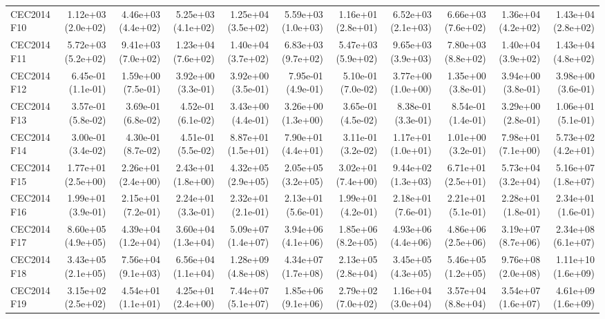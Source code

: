 \begin{longtable}{lrrrrrrrrrr}
CEC2014 F10 & 1.12e+03 (2.0e+02) & 4.46e+03 (4.4e+02) & 5.25e+03 (4.1e+02) & 1.25e+04 (3.5e+02) & 5.59e+03 (1.0e+03) & 1.16e+01 (2.8e+01) & 6.52e+03 (2.1e+03) & 6.66e+03 (7.6e+02) & 1.36e+04 (4.2e+02) & 1.43e+04 (2.8e+02) \\
CEC2014 F11 & 5.72e+03 (5.2e+02) & 9.41e+03 (7.0e+02) & 1.23e+04 (7.6e+02) & 1.40e+04 (3.7e+02) & 6.83e+03 (9.7e+02) & 5.47e+03 (5.9e+02) & 9.65e+03 (3.9e+03) & 7.80e+03 (8.8e+02) & 1.40e+04 (3.9e+02) & 1.43e+04 (4.8e+02) \\
CEC2014 F12 & 6.45e-01 (1.1e-01) & 1.59e+00 (7.5e-01) & 3.92e+00 (3.3e-01) & 3.92e+00 (3.5e-01) & 7.95e-01 (4.9e-01) & 5.10e-01 (7.0e-02) & 3.77e+00 (1.0e+00) & 1.35e+00 (3.8e-01) & 3.94e+00 (3.8e-01) & 3.98e+00 (3.6e-01) \\
CEC2014 F13 & 3.57e-01 (5.8e-02) & 3.69e-01 (6.8e-02) & 4.52e-01 (6.1e-02) & 3.43e+00 (4.4e-01) & 3.26e+00 (1.3e+00) & 3.65e-01 (4.5e-02) & 8.38e-01 (3.3e-01) & 8.54e-01 (1.4e-01) & 3.29e+00 (2.8e-01) & 1.06e+01 (5.1e-01) \\
CEC2014 F14 & 3.00e-01 (3.4e-02) & 4.30e-01 (8.7e-02) & 4.51e-01 (5.5e-02) & 8.87e+01 (1.5e+01) & 7.90e+01 (4.4e+01) & 3.11e-01 (3.2e-02) & 1.17e+01 (1.0e+01) & 1.01e+00 (3.2e-01) & 7.98e+01 (7.1e+00) & 5.73e+02 (4.2e+01) \\
CEC2014 F15 & 1.77e+01 (2.5e+00) & 2.26e+01 (2.4e+00) & 2.43e+01 (1.8e+00) & 4.32e+05 (2.9e+05) & 2.05e+05 (3.2e+05) & 3.02e+01 (7.4e+00) & 9.44e+02 (1.3e+03) & 6.71e+01 (2.5e+01) & 5.73e+04 (3.2e+04) & 5.16e+07 (1.8e+07) \\
CEC2014 F16 & 1.99e+01 (3.9e-01) & 2.15e+01 (7.2e-01) & 2.24e+01 (3.3e-01) & 2.32e+01 (2.1e-01) & 2.13e+01 (5.6e-01) & 1.99e+01 (4.2e-01) & 2.18e+01 (7.6e-01) & 2.21e+01 (5.1e-01) & 2.28e+01 (1.8e-01) & 2.34e+01 (1.6e-01) \\
CEC2014 F17 & 8.60e+05 (4.9e+05) & 4.39e+04 (1.2e+04) & 3.60e+04 (1.3e+04) & 5.09e+07 (1.4e+07) & 3.94e+06 (4.1e+06) & 1.85e+06 (8.2e+05) & 4.93e+06 (4.4e+06) & 4.86e+06 (2.5e+06) & 3.19e+07 (8.7e+06) & 2.34e+08 (6.1e+07) \\
CEC2014 F18 & 3.43e+05 (2.1e+05) & 7.56e+04 (9.1e+03) & 6.56e+04 (1.1e+04) & 1.28e+09 (4.8e+08) & 4.34e+07 (1.7e+08) & 2.13e+05 (2.8e+04) & 3.45e+05 (4.3e+05) & 5.46e+05 (1.2e+05) & 9.76e+08 (2.0e+08) & 1.11e+10 (1.6e+09) \\
CEC2014 F19 & 3.15e+02 (2.5e+02) & 4.54e+01 (1.1e+01) & 4.25e+01 (2.4e+00) & 7.44e+07 (5.1e+07) & 1.85e+06 (9.1e+06) & 2.79e+02 (7.0e+02) & 1.16e+04 (3.0e+04) & 3.57e+04 (8.8e+04) & 3.54e+07 (1.6e+07) & 4.61e+09 (1.6e+09) \\

\end{longtable}
